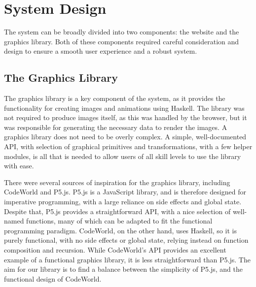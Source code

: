 \documentclass[../main.tex]{subfiles}
\begin{document}
\chapter{System Design} \label{ch:design}
    The system can be broadly divided into two components: the website and the
        graphics library.
    Both of these components required careful consideration and design to ensure a
        smooth user experience and a robust system.

    \section{The Graphics Library}
        The graphics library is a key component of the system, as it provides the
            functionality for creating images and animations using Haskell.
        The library was not required to produce images itself, as this was handled by
            the browser, but it was responsible for generating the necessary data to render
            the images.
        A graphics library does not need to be overly complex.
        A simple, well-documented API, with selection of graphical primitives and
            transformations, with a few helper modules, is all that is needed to allow
            users of all skill levels to use the library with ease.

        There were several sources of inspiration for the graphics library, including
            CodeWorld and P5.js.
        P5.js is a JavaScript library, and is therefore designed for imperative
            programming, with a large reliance on side effects and global state.
        Despite that, P5.js provides a straightforward API, with a nice selection of
            well-named functions, many of which can be adapted to fit the functional
            programming paradigm.
        CodeWorld, on the other hand, uses Haskell, so it is purely functional, with no
            side effects or global state, relying instead on function composition and
            recursion.
        While CodeWorld's API provides an excellent example of a functional graphics
            library, it is less straightforward than P5.js.
        The aim for our library is to find a balance between the simplicity of P5.js,
            and the functional design of CodeWorld.
\end{document}

